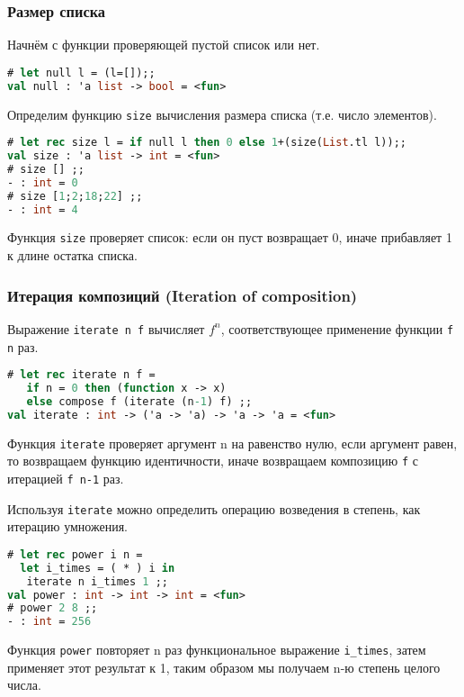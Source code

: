 \subsubsection{Размер списка}

Начнём с функции проверяющей пустой список или нет.

\begin{lstlisting}[language=OCaml]
# let null l = (l=[]);;
val null : 'a list -> bool = <fun>
\end{lstlisting}

Определим функцию \texttt{size} вычисления размера списка (т.е. число
элементов).

\begin{lstlisting}[language=OCaml]
# let rec size l = if null l then 0 else 1+(size(List.tl l));;
val size : 'a list -> int = <fun>
# size [] ;;
- : int = 0
# size [1;2;18;22] ;;
- : int = 4
\end{lstlisting}

Функция \texttt{size} проверяет список: если он пуст возвращает 0, иначе
прибавляет 1 к длине остатка списка.

\subsubsection{Итерация композиций (Iteration of composition)}

Выражение \texttt{iterate n f} вычисляет $f^n$, соответствующее применение
функции \texttt{f n} раз.

\begin{lstlisting}[language=OCaml]
# let rec iterate n f =
   if n = 0 then (function x -> x)
   else compose f (iterate (n-1) f) ;;
val iterate : int -> ('a -> 'a) -> 'a -> 'a = <fun>
\end{lstlisting}

Функция \texttt{iterate} проверяет аргумент n на равенство нулю, если аргумент
равен, то возвращаем функцию идентичности, иначе возвращаем композицию
\texttt{f} с итерацией \texttt{f n-1} раз.

Используя \texttt{iterate} можно определить операцию возведения в степень, как
итерацию умножения.

\begin{lstlisting}[language=OCaml]
# let rec power i n =
  let i_times = ( * ) i in
   iterate n i_times 1 ;;
val power : int -> int -> int = <fun>
# power 2 8 ;;
- : int = 256
\end{lstlisting}

Функция \texttt{power} повторяет n раз функциональное выражение
\texttt{i\_times}, затем применяет этот результат к 1, таким образом мы получаем
n-ю степень целого числа.

